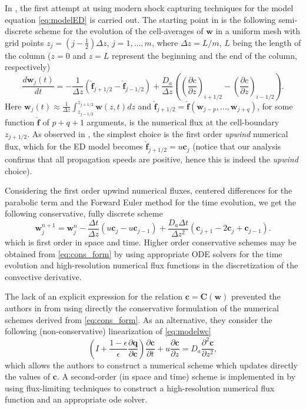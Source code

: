 \documentclass[preprint]{elsarticle}
\theoremstyle{definition}
\newcommand{\bbc}{{\boldsymbol c}}
\newcommand{\bbw}{{\boldsymbol w}}
\newcommand{\bw}{\boldsymbol w}
\newcommand{\bc}{\boldsymbol c}
\newcommand{\bC}{\boldsymbol C}
\newcommand{\bq}{\boldsymbol q}
\newcommand{\bfj}{\boldsymbol{\hat f}}
\begin{document}
In \cite{Javeed}, the first attempt at
using  modern shock capturing techniques for the model equation
\eqref{eq:modelED} is carried out.  The starting point in \cite{Javeed} is the following 
semi-discrete scheme for the evolution of the cell-averages of $\bw$
in  a
uniform mesh with grid points $z_j=(j-\frac{1}{2})\Delta z$,
$j=1,\dots,m$, where $\Delta z=L/m$, $L$ being the length of the
column ($z=0$ and $z=L$ represent the beginning and the end of
the column, respectively) 
\begin{equation}\label{eq:cons_form}
\frac{d {\boldsymbol w}_j (t)}{d t}=-\frac{1}{\Delta z} 
 \left(
{\boldsymbol{ \hat f}}_{j+1/2}-{\boldsymbol{\hat f}}_{j-1/2} 
\right)+ \frac{D_a}{\Delta z} \left ( 
\left( \frac{\partial c}{\partial z}\right )_{i+1/2}-
\left( \frac{\partial c}{\partial z}\right )_{i-1/2} \right ).
\end{equation}
Here 
$\bw_j(t)\approx \frac{1}{\Delta
  z}\int_{z_{j-1/2}}^{z_{j+1/2}}\bw(z,t)dz$  
and $\hat{\boldsymbol{f}}_{j+1/2}= \hat{\boldsymbol{f}}({\boldsymbol
  w}_{j-p},\dots,{\boldsymbol w}_{j+q})$, for some function
$\hat{\boldsymbol{f}}$ of $p+q+1$ arguments, 
is the numerical flux at  the cell-boundary $z_{j+1/2}$. As observed
in \cite{Javeed}, 
the simplest choice is the first order {\em upwind} numerical 
flux, which for the ED model becomes $\bfj_{j+1/2} = u\bc_j $ (notice that our analysis confirms that  all propagation speeds
are positive, hence this is indeed the {\em upwind} choice). 

 Considering the first order upwind numerical fluxes,  centered differences for the parabolic term and 
  the Forward Euler method  for the time evolution, we get the
 following  conservative, fully discrete scheme
\begin{equation}\label{eq:fullydiscreteFE}
{\boldsymbol w}_j^{n+1} ={\boldsymbol w}_j^{n}-\frac{\Delta t}{\Delta
  z} \left(
u \bc_j - u \bc_{j-1} \right)
+\frac{D_a \Delta t}{\Delta z^2} \left(\bc_{j+1} -2 \bc_j + \bc_{j-1}\right).
\end{equation}
which is  first order in space and time. Higher order conservative  schemes may be
obtained from  \eqref{eq:cons_form} by using appropriate ODE solvers
for the time evolution  and  high-resolution numerical flux functions
in the discretization of the convective derivative.




The  lack of an explicit expression for the relation $\bbc=\bC(\bbw)$
prevented the authors in \cite{Javeed} from using directly the
conservative formulation of the numerical schemes derived from
\eqref{eq:cons_form}. As an alternative,  they consider  the following 
(non-conservative) linearization of  \eqref{eq:modelwc} 
\begin{equation*} 
(I+\frac{1-\epsilon}{\epsilon} \frac{\partial \bq}{\partial \bc})
\frac{\partial \bc}{\partial t} + 
u \frac{\partial \bc}{\partial z} = D_a \frac{\partial^2 \bc}{\partial
  z^2},
\end{equation*}
which allows the authors  to construct a numerical
scheme which updates directly 
the values of $\bc$.  A second-order (in space and time) scheme is
implemented in \cite{Javeed} by using flux-limiting techniques to construct a
high-resolution  numerical flux function and an appropriate ode solver.
\end{document}
